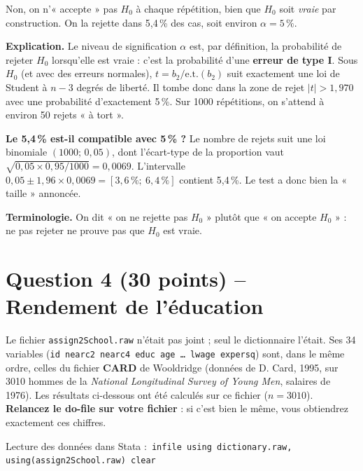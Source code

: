 \documentclass[11pt,a4paper]{article}
\begin{document}
\begin{reponse}
Non, on n'« accepte » pas $H_0$ à chaque répétition, bien que $H_0$ soit \emph{vraie} par construction. On la rejette dans 5,4\,\% des cas, soit environ $\alpha=5\,\%$.

\textbf{Explication.} Le niveau de signification $\alpha$ est, par définition, la probabilité de rejeter $H_0$ lorsqu'elle est vraie : c'est la probabilité d'une \textbf{erreur de type I}. Sous $H_0$ (et avec des erreurs normales), $t=b_2/\text{e.t.}(b_2)$ suit exactement une loi de Student à $n-3$ degrés de liberté. Il tombe donc dans la zone de rejet $|t|>1{,}970$ avec une probabilité d'exactement 5\,\%. Sur 1000 répétitions, on s'attend à environ 50 rejets « à tort ».

\textbf{Le 5,4\,\% est-il compatible avec 5\,\% ?} Le nombre de rejets suit une loi binomiale $(1000;\,0{,}05)$, dont l'écart-type de la proportion vaut $\sqrt{0{,}05\times0{,}95/1000}=0{,}0069$. L'intervalle $0{,}05\pm1{,}96\times0{,}0069=[3{,}6\,\%;\ 6{,}4\,\%]$ contient 5,4\,\%. Le test a donc bien la « taille » annoncée.

\textbf{Terminologie.} On dit « on ne rejette pas $H_0$ » plutôt que « on accepte $H_0$ » : ne pas rejeter ne prouve pas que $H_0$ est vraie.
\end{reponse}

\section{Question 4 (30 points) -- Rendement de l'éducation}

\begin{attention}[title={Note sur les données}]
Le fichier \texttt{assign2School.raw} n'était pas joint ; seul le dictionnaire l'était. Ses 34 variables (\texttt{id nearc2 nearc4 educ age \dots\ lwage expersq}) sont, dans le même ordre, celles du fichier \textbf{CARD} de Wooldridge (données de D. Card, 1995, sur 3010 hommes de la \emph{National Longitudinal Survey of Young Men}, salaires de 1976). Les résultats ci-dessous ont été calculés sur ce fichier ($n=3010$). \textbf{Relancez le do-file sur votre fichier} : si c'est bien le même, vous obtiendrez exactement ces chiffres.

Lecture des données dans Stata :\ \texttt{infile using dictionary.raw, using(assign2School.raw) clear}
\end{attention}
\end{document}
